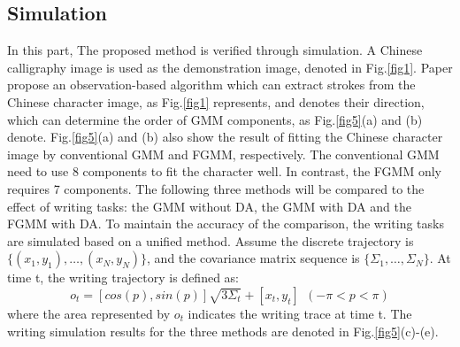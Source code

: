 \documentclass[conference]{IEEEtran}
\begin{document}
\subsection{Simulation}
In this part, The proposed method is verified through simulation. A Chinese calligraphy image is used as the demonstration image, denoted in Fig.\ref{fig1}. Paper \cite{Li2022} propose an observation-based algorithm which can extract strokes from the Chinese character image, as Fig.\ref{fig1} represents, and denotes their direction, which can determine the order of GMM components, as Fig.\ref{fig5}(a) and (b) denote. Fig.\ref{fig5}(a) and (b) also show the result of fitting the Chinese character image by conventional GMM and FGMM, respectively. The conventional GMM need to use 8 components to fit the character well. In contrast, the FGMM only requires 7 components. The following three methods will be compared to the effect of writing tasks: the GMM without DA, the GMM with DA and the FGMM with DA. To maintain the accuracy of the comparison, the writing tasks are simulated based on a unified method. Assume the discrete trajectory is $\{(x_1,y_1),\hdots,(x_N,y_N)\}$, and the covariance matrix sequence is $\{\Sigma_1,\hdots,\Sigma_N\}$. At time t, the writing trajectory is defined as:
\begin{equation}
    o_t =[cos(p),sin(p)]\sqrt{3\Sigma_t}+[x_t,y_t]~~(-\pi<p<\pi)
\end{equation}
where the area represented by $o_t$ indicates the writing trace at time t. The writing simulation results for the three methods are denoted in Fig.\ref{fig5}(c)-(e).
\end{document}
